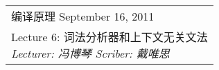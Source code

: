 \def\lecture{6}
\clearpage \noindent\begin{tabularx}{\linewidth}{|X|}
\hline \vskip -2mm
{\sf 编译原理} \hfill September 16, 2011 \\
{\centering \sf \large Lecture \lecture:
词法分析器和上下文无关文法 \\ }
\textsl{Lecturer: 冯博琴 \hfill Scriber: 戴唯思}\\ \hline
\end{tabularx}
\setcounter{section}{0}
\renewcommand{\thepage}{\lecture -\arabic{page}}

